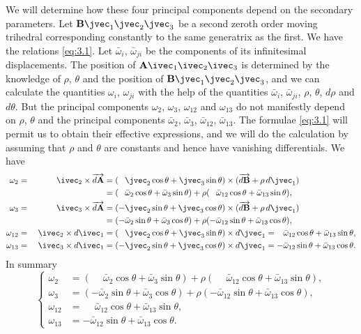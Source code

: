 We will determine how these four principal components depend on the secondary parameters. Let $\mathbf{B}\jvec_{1}\jvec_{2}\jvec_{3}$ be a second zeroth order moving trihedral corresponding constantly to the same generatrix as the first. We have the relations \eqref{eq:3.1}. Let $\bar\omega_{i}$, $\bar\omega_{ji}$ be the components of its infinitesimal displacements. The position of $\mathbf{A}\ivec_{1}\ivec_{2}\ivec_{3}$ is determined by the knowledge of $\rho$, $\theta$ and the position of $\mathbf{B}\jvec_{1}\jvec_{2}\jvec_{3}$, and we can calculate the quantities $\omega_{i}$, $\omega_{ji}$ with the help of the quantities $\bar\omega_{i}$, $\bar\omega_{ji}$, $\rho$, $\theta$, $d\rho$ and $d\theta$. But the principal components $\omega_{2}$, $\omega_{3}$, $\omega_{12}$ and $\omega_{13}$ do not manifestly depend on $\rho$, $\theta$ and the principal components $\bar \omega_{2}$, $\bar\omega_{3}$, $\bar\omega_{12}$, $\bar\omega_{13}$. The formulae \eqref{eq:3.1} will permit us to obtain their effective expressions, and we will do the calculation by assuming that $\rho$ and $\theta$ are constants and hence have vanishing differentials. We have
\begin{alignat*}{5}
  \omega_{2}&{}={}&{}\ivec_{2}\times\overrightarrow{d\mathbf{A}}&=(\hphantom{+}\jvec_{2}\cos\theta+\jvec_{3}\sin\theta)\times(\overrightarrow{d\mathbf{B}}+\rho\,d\jvec_{1})\\
  &&&=(\phantom{+}\bar\omega_{2}\cos\theta+\bar\omega_{3}\sin\theta)+\rho(\hphantom{+}\bar\omega_{12}\cos\theta+\bar\omega_{13}\sin\theta),\\
  \omega_{3}&{}={}&{}\ivec_{3}\times\overrightarrow{d\mathbf{A}}&=(-\jvec_{2}\sin\theta+\jvec_{3}\cos\theta)\times(\overrightarrow{d\mathbf{B}}+\rho\,d\jvec_{1})\\
  &&&=({-}\bar\omega_{2}\sin\theta+\bar\omega_{3}\cos\theta)+\rho(-\bar\omega_{12}\sin\theta+\bar\omega_{13}\cos\theta),\\
  \omega_{12}&{}={}&{}\ivec_{2}\times d\ivec_{1}&=(\phantom{+}\jvec_{2}\cos\theta+\jvec_{3}\sin\theta)\times d\jvec_{1}=\phantom{+}\bar\omega_{12}\cos\theta+\bar\omega_{13}\sin\theta,\\
  \omega_{13}&{}={}&{}\ivec_{3}\times d\ivec_{1}&=({-}\jvec_{2}\sin\theta+\jvec_{3}\cos\theta)\times d\jvec_{1}={-}\bar\omega_{12}\sin\theta+\bar\omega_{13}\cos\theta.
\end{alignat*}
In summary
\begin{equation}
  \label{eq:3.2}
  \left\{
    \begin{aligned}
      \omega_{2}&=(\phantom{+}\bar\omega_{2}\cos\theta+\bar\omega_{3}\sin\theta)+\rho(\phantom{+}\bar\omega_{12}\cos\theta+\bar\omega_{13}\sin\theta),\\
      \omega_{3}&=({-}\bar\omega_{2}\sin\theta+\bar\omega_{3}\cos\theta)+\rho({-}\bar\omega_{12}\sin\theta+\bar\omega_{13}\cos\theta),\\
      \omega_{12}&=\phantom{+}\bar\omega_{12}\cos\theta+\bar\omega_{13}\sin\theta,\\
      \omega_{13}&={-}\bar\omega_{12}\sin\theta+\bar\omega_{13}\cos\theta.
    \end{aligned}
  \right.
\end{equation}


